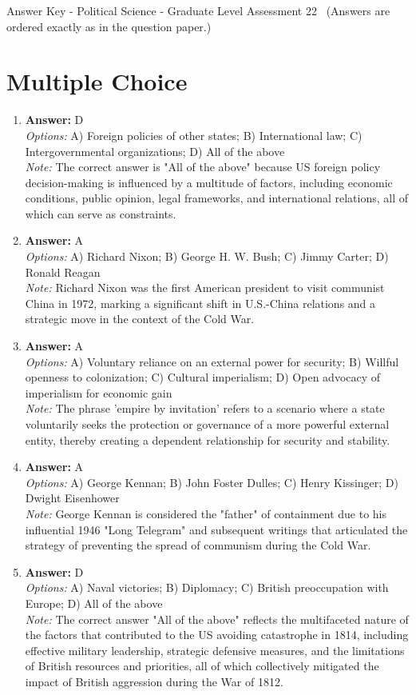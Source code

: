 \documentclass[12pt]{article}
\begin{document}
\begin{center}
Answer Key - Political Science - Graduate Level Assessment 22 \
\small (Answers are ordered exactly as in the question paper.)
\end{center}

\section*{Multiple Choice}
\begin{enumerate}[label=\arabic*.]
\item \textbf{Answer:} D
\\ \textit{Options:} A) Foreign policies of other states; B) International law; C) Intergovernmental organizations; D) All of the above
\\ \textit{Note:} The correct answer is "All of the above" because US foreign policy decision-making is influenced by a multitude of factors, including economic conditions, public opinion, legal frameworks, and international relations, all of which can serve as constraints.
\item \textbf{Answer:} A
\\ \textit{Options:} A) Richard Nixon; B) George H. W. Bush; C) Jimmy Carter; D) Ronald Reagan
\\ \textit{Note:} Richard Nixon was the first American president to visit communist China in 1972, marking a significant shift in U.S.-China relations and a strategic move in the context of the Cold War.
\item \textbf{Answer:} A
\\ \textit{Options:} A) Voluntary reliance on an external power for security; B) Willful openness to colonization; C) Cultural imperialism; D) Open advocacy of imperialism for economic gain
\\ \textit{Note:} The phrase 'empire by invitation' refers to a scenario where a state voluntarily seeks the protection or governance of a more powerful external entity, thereby creating a dependent relationship for security and stability.
\item \textbf{Answer:} A
\\ \textit{Options:} A) George Kennan; B) John Foster Dulles; C) Henry Kissinger; D) Dwight Eisenhower
\\ \textit{Note:} George Kennan is considered the "father" of containment due to his influential 1946 "Long Telegram" and subsequent writings that articulated the strategy of preventing the spread of communism during the Cold War.
\item \textbf{Answer:} D
\\ \textit{Options:} A) Naval victories; B) Diplomacy; C) British preoccupation with Europe; D) All of the above
\\ \textit{Note:} The correct answer "All of the above" reflects the multifaceted nature of the factors that contributed to the US avoiding catastrophe in 1814, including effective military leadership, strategic defensive measures, and the limitations of British resources and priorities, all of which collectively mitigated the impact of British aggression during the War of 1812.
\end{enumerate}
\end{document}
